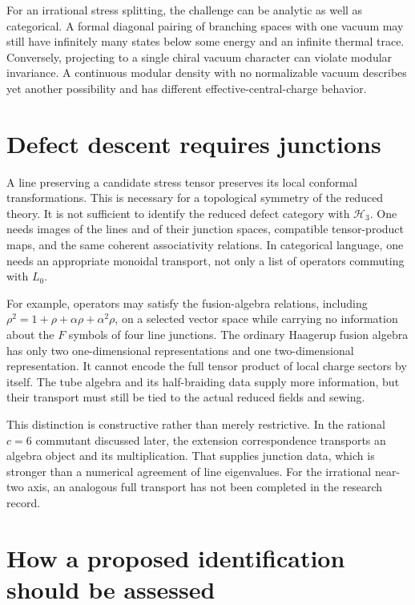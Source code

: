 For an irrational stress splitting, the challenge can be analytic
as well as categorical. A formal diagonal pairing of branching
spaces with one vacuum may still have infinitely many states
below some energy and an infinite thermal trace. Conversely,
projecting to a single chiral vacuum character can violate modular
invariance. A continuous modular density with no normalizable
vacuum describes yet another possibility and has different
effective-central-charge behavior.

\section{Defect descent requires junctions}

A line preserving a candidate stress tensor preserves its local
conformal transformations. This is necessary for a topological
symmetry of the reduced theory. It is not sufficient to identify
the reduced defect category with $\mathcal H_3$.
One needs images of the lines and of their junction spaces,
compatible tensor-product maps, and the same coherent associativity
relations. In categorical language, one needs an appropriate
monoidal transport, not only a list of operators commuting with
$L_0$.

For example, operators may satisfy the fusion-algebra relations,
including $\rho^2=1+\rho+\alpha\rho+\alpha^2\rho$, on a selected
vector space while carrying no information about the $F$ symbols of
four line junctions. The ordinary Haagerup fusion algebra has
only two one-dimensional representations and one two-dimensional
representation. It cannot encode the full tensor product of
local charge sectors by itself. The tube algebra and its
half-braiding data supply more information, but their transport
must still be tied to the actual reduced fields and sewing.

This distinction is constructive rather than merely restrictive.
In the rational $c=6$ commutant discussed later, the extension
correspondence transports an algebra object and its multiplication.
That supplies junction data, which is stronger than a numerical
agreement of line eigenvalues. For the irrational near-two axis,
an analogous full transport has not been completed in the
research record.

\section{How a proposed identification should be assessed}

